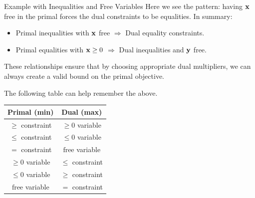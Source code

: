 \begin{example}{Example with Inequalities and Free Variables}{}
Here we see the pattern: having $\mathbf{x}$ free in the primal forces the dual constraints to be equalities. In summary:
\begin{itemize}
\item Primal inequalities with $\mathbf{x}$ free $\Rightarrow$ Dual equality constraints.
\item Primal equalities with $\mathbf{x} \geq 0$ $\Rightarrow$ Dual inequalities and $\mathbf{y}$ free.
\end{itemize}

These relationships ensure that by choosing appropriate dual multipliers, we can always create a valid bound on the primal objective.

The following table can help remember the above.\\

\begin{center}
\begin{tabular}{cc}
\toprule
\textbf{Primal (min)}       & \textbf{Dual (max)}      \\ 
\midrule
\(\geq\) constraint         & \(\geq 0\) variable      \\ 
\(\leq\) constraint         & \(\leq 0\) variable      \\ 
\(=\) constraint            & \(\text{free}\) variable \\ 
\(\geq 0\) variable         & \(\leq\) constraint      \\ 
\(\leq 0\) variable         & \(\geq\) constraint      \\ 
\(\text{free}\) variable    & \(=\) constraint         \\ 
\bottomrule
\end{tabular}
\par{}\label{tab:duality-tab01}%

\end{center}
\end{example}

